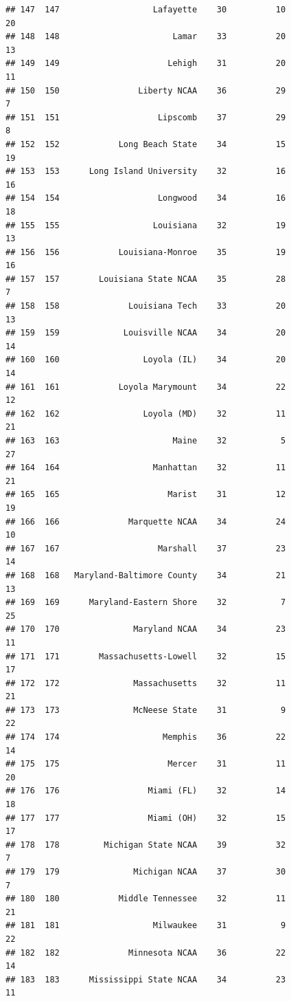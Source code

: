 \documentclass[]{book}
\begin{document}
\begin{verbatim}
## 147  147                   Lafayette    30          10            20
## 148  148                       Lamar    33          20            13
## 149  149                      Lehigh    31          20            11
## 150  150                Liberty NCAA    36          29             7
## 151  151                    Lipscomb    37          29             8
## 152  152            Long Beach State    34          15            19
## 153  153      Long Island University    32          16            16
## 154  154                    Longwood    34          16            18
## 155  155                   Louisiana    32          19            13
## 156  156            Louisiana-Monroe    35          19            16
## 157  157        Louisiana State NCAA    35          28             7
## 158  158              Louisiana Tech    33          20            13
## 159  159             Louisville NCAA    34          20            14
## 160  160                 Loyola (IL)    34          20            14
## 161  161            Loyola Marymount    34          22            12
## 162  162                 Loyola (MD)    32          11            21
## 163  163                       Maine    32           5            27
## 164  164                   Manhattan    32          11            21
## 165  165                      Marist    31          12            19
## 166  166              Marquette NCAA    34          24            10
## 167  167                    Marshall    37          23            14
## 168  168   Maryland-Baltimore County    34          21            13
## 169  169      Maryland-Eastern Shore    32           7            25
## 170  170               Maryland NCAA    34          23            11
## 171  171        Massachusetts-Lowell    32          15            17
## 172  172               Massachusetts    32          11            21
## 173  173               McNeese State    31           9            22
## 174  174                     Memphis    36          22            14
## 175  175                      Mercer    31          11            20
## 176  176                  Miami (FL)    32          14            18
## 177  177                  Miami (OH)    32          15            17
## 178  178         Michigan State NCAA    39          32             7
## 179  179               Michigan NCAA    37          30             7
## 180  180            Middle Tennessee    32          11            21
## 181  181                   Milwaukee    31           9            22
## 182  182              Minnesota NCAA    36          22            14
## 183  183      Mississippi State NCAA    34          23            11

\end{verbatim}
\end{document}
